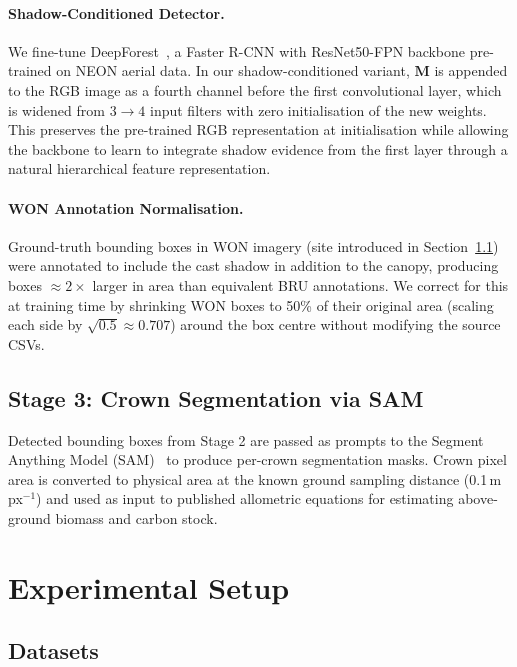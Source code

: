 \documentclass[10pt,twocolumn]{article}
\begin{document}
\paragraph{Shadow-Conditioned Detector.}
We fine-tune DeepForest~\cite{weinstein2020neon}, a Faster R-CNN with
ResNet50-FPN backbone pre-trained on NEON aerial data.
In our shadow-conditioned variant, $\mathbf{M}$ is appended to the RGB image
as a fourth channel before the first convolutional layer, which is widened
from $3 \to 4$ input filters with zero initialisation of the new weights.
This preserves the pre-trained RGB representation at initialisation while
allowing the backbone to learn to integrate shadow evidence from the first
layer through a natural hierarchical feature representation.

\paragraph{WON Annotation Normalisation.}
Ground-truth bounding boxes in WON imagery (site introduced in
Section~\ref{sec:datasets}) were annotated to include the cast shadow in
addition to the canopy, producing boxes $\approx 2\times$ larger in area
than equivalent BRU annotations. We correct for this at training time by
shrinking WON boxes to 50\% of their original area (scaling each side by
$\sqrt{0.5} \approx 0.707$) around the box centre without modifying the
source CSVs.

\subsection{Stage 3: Crown Segmentation via SAM}

Detected bounding boxes from Stage 2 are passed as prompts to the Segment
Anything Model (SAM)~\cite{kirillov2023sam} to produce per-crown segmentation
masks. Crown pixel area is converted to physical area at the known ground
sampling distance (0.1\,m\,px$^{-1}$) and used as input to published allometric
equations for estimating above-ground biomass and carbon stock.

\section{Experimental Setup}

\subsection{Datasets}
\label{sec:datasets}
\end{document}
